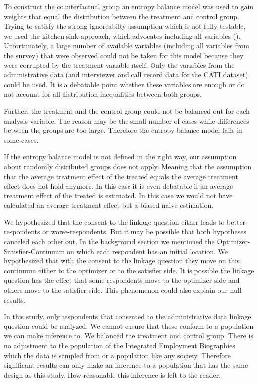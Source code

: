 To construct the counterfactual group an entropy balance model was used to gain weights that equal the distribution between the treatment and control group. Trying to satisfy the strong ignoreabilty assumption which is not fully testable, we used the kitchen sink approach, which advocates including all variables (\cite{Eckmanetal15}). Unfortunately, a large number of available variables (including all variables from the survey) that were observed could not be taken for this model because they were corrupted by the treatment variable itself. Only the variables from the administrative data (and interviewer and call record data for the CATI dataset) could be used. It is a debatable point whether these variables are enough or do not account for all distribution inequalities between both groups.

Further, the treatment and the control group could not be balanced out for each analysis variable. The reason may be the small number of cases while differences between the groups are too large. Therefore the entropy balance model fails in some cases.

If the entropy balance model is not defined in the right way, our assumption about randomly distributed groups does not apply. Meaning that the assumption that the average treatment effect of the treated equals the average treatment effect does not hold anymore. In this case it is even debatable if an average treatment effect of the treated is estimated. In this case we would not have calculated an average treatment effect but a biased naive estimation.

We hypothesized that the consent to the linkage question either leads to better-respondents or worse-respondents. But it may be possible that both hypotheses canceled each other out. In the background section we mentioned the Optimizer-Satisfier-Continuum on which each respondent has an initial location. We hypothesized that with the consent to the linkage question they move on this continuum either to the optimizer or to the satisfier side. It is possible the linkage question has the effect that some respondents move to the optimizer side and others move to the satisfier side. This phenomenon could also explain our null results.

In this study, only respondents that consented to the administrative data linkage question could be analyzed. We cannot ensure that these conform to a population we can make inference to. We balanced the treatment and control group. There is no adjustment to the population of the Integrated Employment Biographies which the data is sampled from or a population like any society. Therefore significant results can only make an inference to a population that has the same design as this study. How reasonable this inference is left to the reader.

